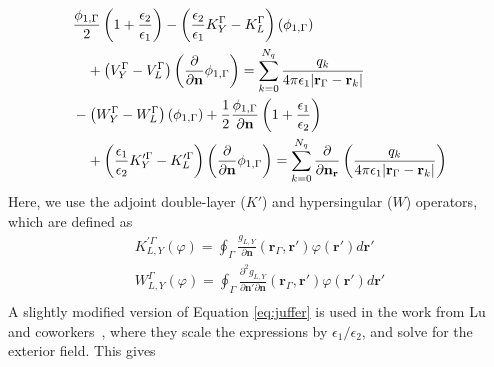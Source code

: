 \begin{align}\label{eq:juffer}
    &\begin{multlined}[t][0.48\textwidth] \frac{\phi_{1,\Gamma}}{2}\left(1+\frac{\epsilon_2}{\epsilon_1}\right) - \left(\frac{\epsilon_2}{\epsilon_1}K_Y^\Gamma - K_L^\Gamma\right)(\phi_{1,\Gamma}) \\
    + \left(V_Y^\Gamma - V_L^\Gamma\right)\left( \frac{\partial}{\partial \mathbf{n}} \phi_{1,\Gamma} \right) = \sum_{k=0}^{N_q}  \frac{q_k}{4\pi\epsilon_1|\mathbf{r}_{\Gamma} - \mathbf{r}_k|}
    \end{multlined} \nonumber \\
    &\begin{multlined}[t][0.48\textwidth] - \left(W_Y^\Gamma - W_L^\Gamma\right)(\phi_{1,\Gamma}) +  \frac{1}{2}\frac{\phi_{1,\Gamma}}{\partial\mathbf{n}}\left(1+\frac{\epsilon_1}{\epsilon_2}\right) \\
    + \left(\frac{\epsilon_1}{\epsilon_2}K_Y^{\prime\Gamma} - K_L^{\prime\Gamma}\right)\left( \frac{\partial}{\partial \mathbf{n}} \phi_{1,\Gamma} \right) = \sum_{k=0}^{N_q}  \frac{\partial}{\partial\mathbf{n}_\mathbf{r}}\left(\frac{q_k}{4\pi\epsilon_1|\mathbf{r}_{\Gamma} - \mathbf{r}_k|}\right)
    \end{multlined}
\end{align}
%
Here, we use the adjoint double-layer ($K'$) and hypersingular ($W$) operators, which are defined as
%
\begin{align}\label{eq:adj_hyp}
K^{\prime\Gamma}_{L,Y}(\varphi) = \oint_\Gamma \frac{g_{L,Y}}{\partial\mathbf{n}}(\mathbf{r}_\Gamma,\mathbf{r}')\varphi(\mathbf{r}')d\mathbf{r}'\nonumber\\
W^\Gamma_{L,Y}(\varphi) = \oint_\Gamma \frac{\partial^2 g_{L,Y}}{\partial\mathbf{n}'\partial\mathbf{n}}(\mathbf{r}_\Gamma,\mathbf{r}')\varphi(\mathbf{r}')d\mathbf{r}'\nonumber\\
\end{align}
%
A slightly modified version of Equation \eqref{eq:juffer} is used in the work from Lu and coworkers~\cite{LuETal2006,LuETal2009,ZhangETal2019}, where they scale the expressions by $\epsilon_1/\epsilon_2$, and solve for the exterior field. This gives
%
